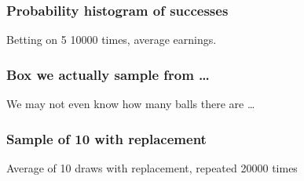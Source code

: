 \documentclass[handout]{beamer}
\begin{document}
   \begin{frame}
   \frametitle{Probability histogram of successes}
   \begin{center}
   \end{center}
   Betting on {\color{red} 5} 10000 times, average earnings.
   \end{frame}



   \begin{frame}
   \frametitle{Box we actually sample from \dots}
   \begin{center}
   \end{center}
   We may not even know how many balls there are \dots
   \end{frame}



   \begin{frame}
   \frametitle{Sample of 10 with replacement}
   \begin{center}
   \end{center}
   Average of 10 draws with replacement, repeated 20000 times
   \end{frame}
\end{document}

